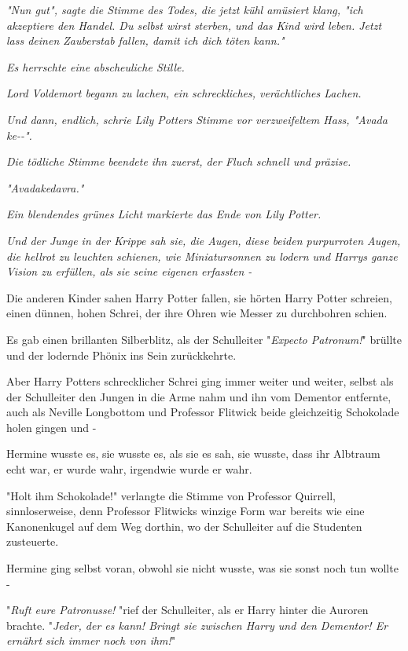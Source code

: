 {\emph{"Nun gut", sagte die Stimme des Todes, die jetzt kühl amüsiert klang, "ich akzeptiere den Handel. Du selbst wirst sterben, und das Kind wird leben. Jetzt lass deinen Zauberstab fallen, damit ich dich töten kann."}

\emph{Es herrschte eine abscheuliche Stille.}

\emph{Lord Voldemort begann zu lachen, ein schreckliches, verächtliches Lachen.}

\emph{Und dann, endlich, schrie Lily Potters Stimme vor verzweifeltem Hass, "Avada ke-\/-".}

\emph{Die tödliche Stimme beendete ihn zuerst, der Fluch schnell und präzise.}

\emph{"Avadakedavra."}

\emph{Ein blendendes grünes Licht markierte das Ende von Lily Potter.}

\emph{Und der Junge in der Krippe sah sie, die Augen, diese beiden purpurroten Augen, die hellrot zu leuchten schienen, wie Miniatursonnen zu lodern und Harrys ganze Vision zu erfüllen, als sie seine eigenen erfassten -}

Die anderen Kinder sahen Harry Potter fallen, sie hörten Harry Potter schreien, einen dünnen, hohen Schrei, der ihre Ohren wie Messer zu durchbohren schien.

Es gab einen brillanten Silberblitz, als der Schulleiter "\emph{Expecto Patronum!}" brüllte und der lodernde Phönix ins Sein zurückkehrte.

Aber Harry Potters schrecklicher Schrei ging immer weiter und weiter, selbst als der Schulleiter den Jungen in die Arme nahm und ihn vom Dementor entfernte, auch als Neville Longbottom und Professor Flitwick beide gleichzeitig Schokolade holen gingen und -

Hermine wusste es, sie wusste es, als sie es sah, sie wusste, dass ihr Albtraum echt war, er wurde wahr, irgendwie wurde er wahr.

"Holt ihm Schokolade!" verlangte die Stimme von Professor Quirrell, sinnloserweise, denn Professor Flitwicks winzige Form war bereits wie eine Kanonenkugel auf dem Weg dorthin, wo der Schulleiter auf die Studenten zusteuerte.

Hermine ging selbst voran, obwohl sie nicht wusste, was sie sonst noch tun wollte -

"\emph{Ruft eure Patronusse!} "rief der Schulleiter, als er Harry hinter die Auroren brachte. "\emph{Jeder, der es kann! Bringt sie zwischen Harry und den Dementor! Er} \emph{ernährt sich immer noch von ihm!}"

}
